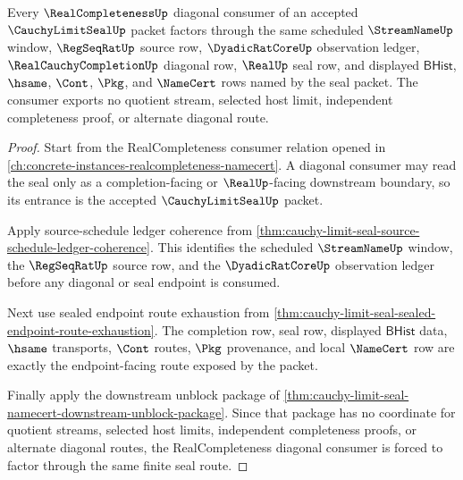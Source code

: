 \begin{theorem}
\label{thm:cauchy-limit-seal-real-completeness-diagonal-consumer-exactness}
Every $\RealCompletenessUp$ diagonal consumer of an accepted $\CauchyLimitSealUp$ packet factors through the same scheduled $\StreamNameUp$ window, $\RegSeqRatUp$ source row, $\DyadicRatCoreUp$ observation ledger, $\RealCauchyCompletionUp$ diagonal row, $\RealUp$ seal row, and displayed $\mathsf{BHist}$, $\hsame$, $\Cont$, $\Pkg$, and $\NameCert$ rows named by the seal packet. The consumer exports no quotient stream, selected host limit, independent completeness proof, or alternate diagonal route.
\end{theorem}
\begin{proof}
Start from the RealCompleteness consumer relation opened in \autoref{ch:concrete-instances-realcompleteness-namecert}. A diagonal consumer may read the seal only as a completion-facing or $\RealUp$-facing downstream boundary, so its entrance is the accepted $\CauchyLimitSealUp$ packet.

Apply source-schedule ledger coherence from \autoref{thm:cauchy-limit-seal-source-schedule-ledger-coherence}. This identifies the scheduled $\StreamNameUp$ window, the $\RegSeqRatUp$ source row, and the $\DyadicRatCoreUp$ observation ledger before any diagonal or seal endpoint is consumed.

Next use sealed endpoint route exhaustion from \autoref{thm:cauchy-limit-seal-sealed-endpoint-route-exhaustion}. The completion row, seal row, displayed $\mathsf{BHist}$ data, $\hsame$ transports, $\Cont$ routes, $\Pkg$ provenance, and local $\NameCert$ row are exactly the endpoint-facing route exposed by the packet.

Finally apply the downstream unblock package of \autoref{thm:cauchy-limit-seal-namecert-downstream-unblock-package}. Since that package has no coordinate for quotient streams, selected host limits, independent completeness proofs, or alternate diagonal routes, the RealCompleteness diagonal consumer is forced to factor through the same finite seal route.
\end{proof}
